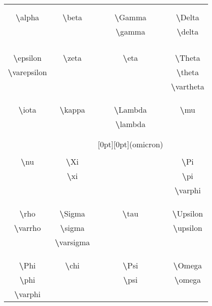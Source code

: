 \documentclass{article}
\newcommand{\gl}[1]{\scalebox{5.5}{\ensuremath{#1}}}
\newcommand{\bs}[1]{{\LARGE \textbf{\textbackslash}#1}}
\begin{document}
	\begin{center}
		\scalebox{4.5}{The \LaTeX\ Greek Alphabet}
	\end{center}
	\setlength{\tabcolsep}{20pt}
	\begin{table}[H]
		\centering
		\begin{tabular}{cccc}
			\gl\alpha & \gl\beta & \gl{\Gamma\gamma} & \gl{\Delta\delta} \\
			&&&\\[-6pt]
			\bs{alpha} & \bs{beta}  & \bs{Gamma} & \bs{Delta} \\
			& & \bs{gamma} & \bs{delta} \\
			&&&\\
			&&&\\
			\gl{\epsilon\varepsilon} & \gl\zeta & \gl\eta & \gl{\Theta\theta\vartheta} \\
			&&&\\[-6pt]
			\bs{epsilon} & \bs{zeta} & \bs{eta} & \bs{Theta} \\
			\bs{varepsilon} & & & \bs{theta} \\
			& & & \bs{vartheta} \\
			&&&\\
			\gl\iota & \gl\kappa & \gl{\Lambda\lambda} & \gl\mu \\
			&&&\\[-6pt]
			\bs{iota} & \bs{kappa} & \bs{Lambda} & \bs{mu} \\
			& & \bs{lambda} &  \\
			&&&\\
			&&&\\
			\gl\nu & \gl{\Xi\xi} & \raisebox{1.4em}[0pt][0pt]{\LARGE(omicron)} & \gl{\Pi\pi\varpi} \\
			&&&\\[-6pt]
			\bs{nu} & \bs{Xi} &  & \bs{Pi} \\
			& \bs{xi} & & \bs{pi} \\
			& & & \bs{varphi} \\
			&&&\\
			\gl{\rho\varrho} & \gl{\Sigma\sigma\varsigma} & \gl\tau & \gl{\Upsilon\upsilon} \\
			&&&\\[-6pt]
			\bs{rho} & \bs{Sigma} & \bs{tau} & \bs{Upsilon} \\
			\bs{varrho} & \bs{sigma} & & \bs{upsilon} \\
			& \bs{varsigma} & & \\
			&&&\\
			\gl{\Phi\phi\varphi} & \gl\chi & \gl{\Psi\psi} & \gl{\Omega\omega} \\
			&&&\\[-6pt]
			\bs{Phi} & \bs{chi} & \bs{Psi} & \bs{Omega} \\
			\bs{phi} &  & \bs{psi} & \bs{omega} \\
			\bs{varphi} & & & \\
		\end{tabular}
	\end{table}
\end{document}

